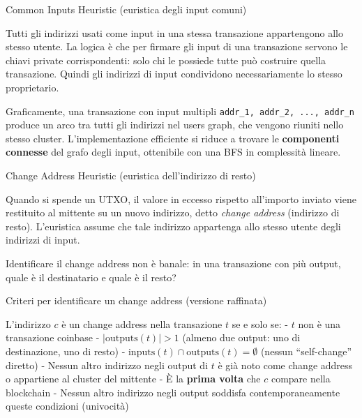 \documentclass[
  italian,
  openany]{book}
\begin{document}
\begin{calloutdefinition}{Common Inputs Heuristic (euristica degli input comuni)}

Tutti gli indirizzi usati come input in una stessa transazione
appartengono allo stesso utente. La logica è che per firmare gli input
di una transazione servono le chiavi private corrispondenti: solo chi le
possiede tutte può costruire quella transazione. Quindi gli indirizzi di
input condividono necessariamente lo stesso proprietario.

\end{calloutdefinition}

Graficamente, una transazione con input multipli
\texttt{addr\_1,\ addr\_2,\ ...,\ addr\_n} produce un arco tra tutti gli
indirizzi nel users graph, che vengono riuniti nello stesso cluster.
L'implementazione efficiente si riduce a trovare le \textbf{componenti
connesse} del grafo degli input, ottenibile con una BFS in complessità
lineare.

\begin{calloutdefinition}{Change Address Heuristic (euristica dell’indirizzo di resto)}

Quando si spende un UTXO, il valore in eccesso rispetto all'importo
inviato viene restituito al mittente su un nuovo indirizzo, detto
\emph{change address} (indirizzo di resto). L'euristica assume che tale
indirizzo appartenga allo stesso utente degli indirizzi di input.

\end{calloutdefinition}

Identificare il change address non è banale: in una transazione con più
output, quale è il destinatario e quale è il resto?

\begin{callouttip}{Criteri per identificare un change address (versione raffinata)}

L'indirizzo \(c\) è un change address nella transazione \(t\) se e solo
se: - \(t\) non è una transazione coinbase - \(|\text{outputs}(t)| > 1\)
(almeno due output: uno di destinazione, uno di resto) -
\(\text{inputs}(t) \cap \text{outputs}(t) = \emptyset\) (nessun
``self-change'' diretto) - Nessun altro indirizzo negli output di \(t\)
è già noto come change address o appartiene al cluster del mittente - È
la \textbf{prima volta} che \(c\) compare nella blockchain - Nessun
altro indirizzo negli output soddisfa contemporaneamente queste
condizioni (univocità)

\end{callouttip}
\end{document}
